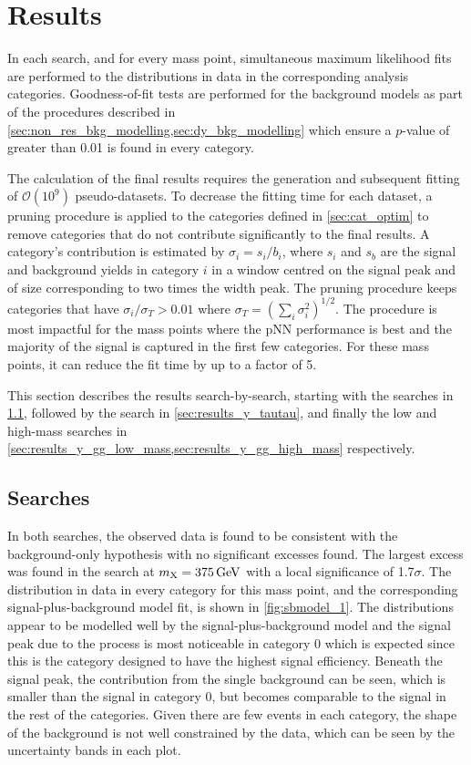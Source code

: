 \section{Results}\label{sec:ggtt_results}

In each search, and for every mass point, simultaneous maximum likelihood fits are performed to the \mgg distributions in data in the corresponding analysis categories. Goodness-of-fit tests are performed for the background models as part of the procedures described in \cref{sec:non_res_bkg_modelling,sec:dy_bkg_modelling} which ensure a $p$-value of greater than 0.01 is found in every category.

The calculation of the final results requires the generation and subsequent fitting of $\mathcal{O} (10^9)$ pseudo-datasets. To decrease the fitting time for each dataset, a pruning procedure is applied to the categories defined in \cref{sec:cat_optim} to remove categories that do not contribute significantly to the final results. A category's contribution is estimated by $\sigma_i = s_i / b_i$, where $s_i$ and $s_b$ are the signal and background yields in category $i$ in a window centred on the \mgg signal peak and of size corresponding to two times the width peak. The pruning procedure keeps categories that have $\sigma_i / \sigma_T > 0.01$ where $\sigma_T = (\sum_i \sigma_i^2)^{1/2}$. The procedure is most impactful for the mass points where the pNN performance is best and the majority of the signal is captured in the first few categories. For these mass points, it can reduce the fit time by up to a factor of 5.   

This section describes the results search-by-search, starting with the \XHH searches in \cref{sec:results_xhh}, followed by the \XYttHgg search in \cref{sec:results_y_tautau}, and finally the low and high-mass \XYggHtt searches in \cref{sec:results_y_gg_low_mass,sec:results_y_gg_high_mass} respectively.

\subsection[\texorpdfstring{\XHH}{XHH} Searches]{\XHH Searches}\label{sec:results_xhh}
In both \XHH searches, the observed data is found to be consistent with the background-only hypothesis with no significant excesses found. The largest excess was found in the \XTwoHH search at $m_{\mathrm{X}}=375\,\text{Ge\hspace{-.08em}V}$ with a local significance of 1.7$\sigma$. The \mgg distribution in data in every category for this mass point, and the corresponding signal-plus-background model fit, is shown in \cref{fig:sbmodel_1}. The \mgg distributions appear to be modelled well by the signal-plus-background model and the signal peak due to the \XHH process is most noticeable in category 0 which is expected since this is the category designed to have the highest signal efficiency. Beneath the signal peak, the contribution from the single \PH background can be seen, which is smaller than the \XHH signal in category 0, but becomes comparable to the signal in the rest of the categories. Given there are few events in each category, the shape of the background is not well constrained by the data, which can be seen by the uncertainty bands in each plot. 


